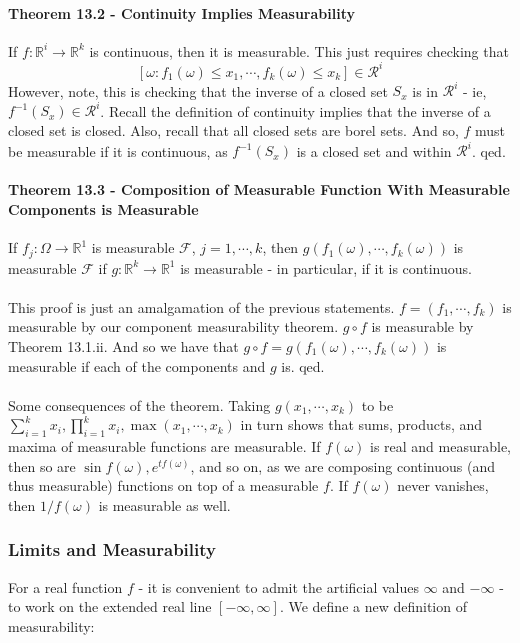 \documentclass[12pt,a4paper]{article}
\newcommand{\1}[1]{\mathbbm{1}\left\{ #1 \right\}}
\newcommand{\R}{\mathbb{R}}
\newcommand{\fcal}{\mathcal{F}}
\newcommand{\rcal}{\mathcal{R}}
\begin{document}
\paragraph{Theorem 13.2 - Continuity Implies Measurability} If $f: \R^i \to \R^k$ is continuous, then it is measurable. This just requires checking that
$$
	\left[\omega: f_1(\omega) \leq x_1, \cdots, f_k(\omega) \leq x_k\right] \in \rcal^i
$$
However, note, this is checking that the inverse of a closed set $S_x$ is in $\rcal^i$ - ie, $f^{-1}(S_x) \in \rcal^i$. Recall the definition of continuity implies that the inverse of a closed set is closed. Also, recall that all closed sets are borel sets. And so, $f$ must be measurable if it is continuous, as $f^{-1}(S_x)$ is a closed set and within $\rcal^i$. qed.

\paragraph{Theorem 13.3 - Composition of Measurable Function With Measurable Components is Measurable} If $f_j: \Omega \to \R^1$ is measurable $\fcal$, $j=1,\cdots,k$, then $g(f_1(\omega), \cdots, f_k(\omega))$ is measurable $\fcal$ if $g: \R^k \to \R^1$ is measurable - in particular, if it is continuous.
\\\\
This proof is just an amalgamation of the previous statements. $f = (f_1, \cdots, f_k)$ is measurable by our component measurability theorem. $g \circ f$ is measurable by Theorem 13.1.ii. And so we have that $g \circ f = g(f_1(\omega), \cdots, f_k(\omega))$ is measurable if each of the components and $g$ is. qed.
\\\\
Some consequences of the theorem. Taking $g(x_1, \cdots, x_k)$ to be $\sum_{i=1}^k x_i, \prod_{i=1}^k x_i, \max(x_1, \cdots, x_k)$ in turn shows that sums, products, and maxima of measurable functions are measurable. If $f(\omega)$ is real and measurable, then so are $\sin f(\omega), e^{tf(\omega)}$, and so on, as we are composing continuous (and thus measurable) functions on top of a measurable $f$. If $f(\omega)$ never vanishes, then $1/f(\omega)$ is measurable as well.

\subsubsection{Limits and Measurability} 
For a real function $f$ - it is convenient to admit the artificial values $\infty$ and $-\infty$ - to work on the extended real line $[-\infty,\infty]$. We define a new definition of measurability:
\end{document}
